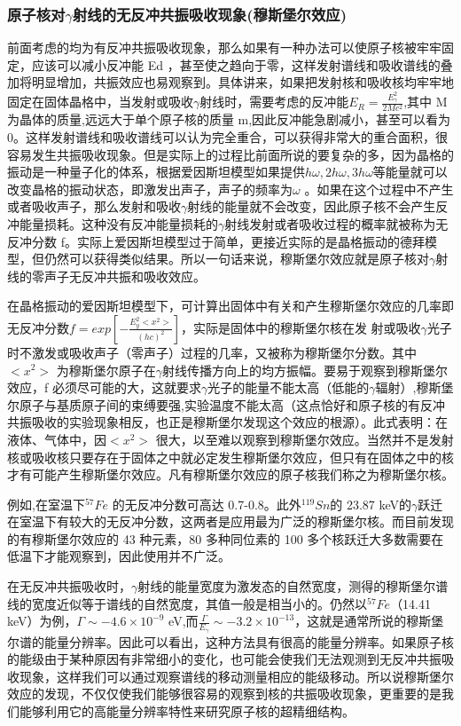 \documentclass[hyperref]{ctexart}
\begin{document}
\begin{multicols}{2}
	\subsubsection{原子核对$\gamma$射线的无反冲共振吸收现象(穆斯堡尔效应)}
	前面考虑的均为有反冲共振吸收现象，那么如果有一种办法可以使原子核被牢牢固定，应该可以减小反冲能 Ed ，甚至使之趋向于零，这样发射谱线和吸收谱线的叠加将明显增加，共振效应也易观察到。具体讲来，如果把发射核和吸收核均牢牢地固定在固体晶格中，当发射或吸收$\gamma$射线时，需要考虑的反冲能$E_R=\frac{E_\gamma^2}{2Mc^2}$,其中 M 为晶体的质量,远远大于单个原子核的质量 m,因此反冲能急剧减小，甚至可以看为 0。这样发射谱线和吸收谱线可以认为完全重合，可以获得非常大的重合面积，很容易发生共振吸收现象。但是实际上的过程比前面所说的要复杂的多，因为晶格的振动是一种量子化的体系，根据爱因斯坦模型如果提供$h\omega,2 h\omega,3 h\omega$等能量就可以改变晶格的振动状态，即激发出声子，声子的频率为$\omega$ 。如果在这个过程中不产生或者吸收声子，那么发射和吸收$\gamma$射线的能量就不会改变，因此原子核不会产生反冲能量损耗。这种没有反冲能量损耗的$\gamma$射线发射或者吸收过程的概率就被称为无反冲分数 f。实际上爱因斯坦模型过于简单，更接近实际的是晶格振动的德拜模型，但仍然可以获得类似结果。所以一句话来说，穆斯堡尔效应就是原子核对$\gamma$射线的零声子无反冲共振和吸收效应。

	在晶格振动的爱因斯坦模型下，可计算出固体中有关和产生穆斯堡尔效应的几率即无反冲分数$f=exp[-\frac{E_y^2<x^2>}{(hc)^2}]$，实际是固体中的穆斯堡尔核在发
射或吸收$\gamma$光子时不激发或吸收声子（零声子）过程的几率，又被称为穆斯堡尔分数。其中$<x^2>$ 为穆斯堡尔原子在$\gamma$射线传播方向上的均方振幅。要易于观察到穆斯堡尔效应，f 必须尽可能的大，这就要求$\gamma$光子的能量不能太高（低能的$\gamma$辐射）,穆斯堡尔原子与基质原子间的束缚要强,实验温度不能太高（这点恰好和原子核的有反冲共振吸收的实验现象相反，也正是穆斯堡尔发现这个效应的根源）。此式表明：在液体、气体中，因$<x^2>$ 很大，以至难以观察到穆斯堡尔效应。当然并不是发射核或吸收核只要存在于固体之中就必定发生穆斯堡尔效应，但只有在固体之中的核才有可能产生穆斯堡尔效应。凡有穆斯堡尔效应的原子核我们称之为穆斯堡尔核。

	例如,在室温下$^{57}Fe$ 的无反冲分数可高达 0.7-0.8。此外$^{119}Sn$的 23.87 keV的$\gamma$跃迁在室温下有较大的无反冲分数，这两者是应用最为广泛的穆斯堡尔核。而目前发现的有穆斯堡尔效应的 43 种元素，80 多种同位素的 100 多个核跃迁大多数需要在低温下才能观察到，因此使用并不广泛。

	在无反冲共振吸收时，$\gamma$射线的能量宽度为激发态的自然宽度，测得的穆斯堡尔谱线的宽度近似等于谱线的自然宽度，其值一般是相当小的。仍然以$^{57}Fe$（14.41 keV）为例，$\Gamma\sim-4.6\times{10}^{-9}$ eV,而$\frac{\Gamma}{E_\gamma}\sim -3.2\times{10}^{-13}$，这就是通常所说的穆斯堡尔谱的能量分辨率。因此可以看出，这种方法具有很高的能量分辨率。如果原子核的能级由于某种原因有非常细小的变化，也可能会使我们无法观测到无反冲共振吸收现象，这样我们可以通过观察谱线的移动测量相应的能级移动。所以说穆斯堡尔效应的发现，不仅仅使我们能够很容易的观察到核的共振吸收现象，更重要的是我们能够利用它的高能量分辨率特性来研究原子核的超精细结构。


\end{multicols}
\end{document}
